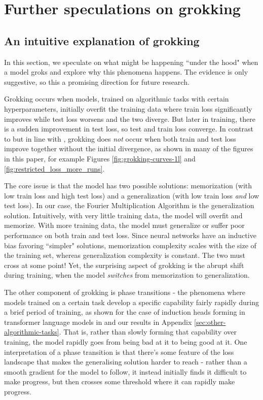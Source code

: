 \documentclass{article} %
\begin{document}
\section{Further speculations on grokking}

\subsection{An intuitive explanation of grokking}

In this section, we speculate on what might be happening ``under the hood" when a model groks and explore why this phenomena happens. The evidence is only suggestive, so this a promising direction for future research.

Grokking occurs when models, trained on algorithmic tasks with certain hyperparameters, initially overfit the training data where train loss significantly improves while test loss worsens and the two diverge. But later in training, there is a sudden improvement in test loss, so test and train loss converge. In contrast to \citet{power2022grokking} but in line with \citet{liu2022towards}, grokking does \textit{not} occur when both train and test loss improve together without the initial divergence, as shown in many of the figures in this paper, for example Figures \ref{fig:grokking-curves-1l} and \ref{fig:restricted_loss_more_runs}. 

The core issue is that the model has two possible solutions: memorization (with low train loss and high test loss) and a generalization (with low train loss \emph{and} low test loss). In our case, the Fourier Multiplication Algorithm is the generalization solution. Intuitively, with very little training data, the model will overfit and memorize. With more training data, the model must generalize or suffer poor performance on both train and test loss. Since neural networks have an inductive bias favoring ``simpler" solutions, memorization complexity scales with the size of the training set, whereas generalization complexity is constant. The two must cross at some point! Yet, the surprising aspect of grokking is the abrupt shift during training, when the model \textit{switches} from memorization to generalization.

The other component of grokking is phase transitions - the phenomena where models trained on a certain task develop a specific capability fairly rapidly during a brief period of training, as shown for the case of induction heads forming in transformer language models in \citet{olsson2022context} and our results in Appendix \ref{sec:other-algorithmic-tasks}. That is, rather than slowly forming that capability over training, the model rapidly goes from being bad at it to being good at it. One interpretation of a phase transition is that there's some feature of the loss landscape that makes the generalising solution harder to reach - rather than a smooth gradient for the model to follow, it instead initially finds it difficult to make progress, but then crosses some threshold where it can rapidly make progress.
\end{document}
